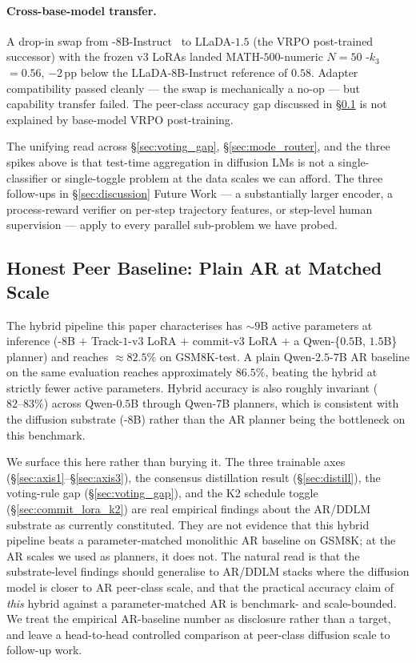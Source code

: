 \paragraph{Cross-base-model transfer.}
A drop-in swap from \LLaDA{}-$8$B-Instruct~\citep{nie2025llada} to
LLaDA-$1.5$ (the VRPO post-trained successor) with the frozen v$3$
LoRAs landed MATH-$500$-numeric $N{=}50$ \cmajc{}-$k_3$ $= 0.56$,
$-2$\,pp below the LLaDA-$8$B-Instruct reference of $0.58$.
Adapter compatibility passed cleanly --- the swap is mechanically
a no-op --- but capability transfer failed.  The peer-class
accuracy gap discussed in \S\ref{subsec:ar_baseline} is not
explained by base-model VRPO post-training.

\medskip

The unifying read across \S\ref{sec:voting_gap},
\S\ref{sec:mode_router}, and the three spikes above is that
test-time aggregation in diffusion LMs is not a
single-classifier or single-toggle problem at the data scales we
can afford.  The three follow-ups in \S\ref{sec:discussion} Future
Work --- a substantially larger encoder, a process-reward verifier
on per-step trajectory features, or step-level human supervision
---  apply to every parallel sub-problem we have probed.

\subsection{Honest Peer Baseline: Plain AR at Matched Scale}
\label{subsec:ar_baseline}

The hybrid pipeline this paper characterises has $\sim 9$B active
parameters at inference (\LLaDA{}-$8$B $+$ Track-$1$-v3 LoRA $+$
commit-v3 LoRA $+$ a Qwen-\{$0.5$B, $1.5$B\} planner) and reaches
\cmajc{} $\approx 82.5\%$ on GSM8K-test.  A plain Qwen-$2.5$-$7$B
AR baseline on the same evaluation reaches approximately $86.5\%$,
beating the hybrid at strictly fewer active parameters.  Hybrid
accuracy is also roughly invariant ($82\text{--}83\%$) across
Qwen-$0.5$B through Qwen-$7$B planners, which is consistent with
the diffusion substrate (\LLaDA{}-$8$B) rather than the AR planner
being the bottleneck on this benchmark.

We surface this here rather than burying it.  The three trainable
axes (\S\ref{sec:axis1}--\S\ref{sec:axis3}), the consensus
distillation result (\S\ref{sec:distill}), the voting-rule gap
(\S\ref{sec:voting_gap}), and the K2 schedule toggle
(\S\ref{sec:commit_lora_k2}) are real empirical findings about the
AR/DDLM substrate as currently constituted.  They are not evidence
that this hybrid pipeline beats a parameter-matched monolithic AR
baseline on GSM8K; at the AR scales we used as planners, it does
not.  The natural read is that the substrate-level findings should
generalise to AR/DDLM stacks where the diffusion model is closer
to AR peer-class scale, and that the practical accuracy claim of
\emph{this} hybrid against a parameter-matched AR is benchmark- and
scale-bounded.  We treat the empirical AR-baseline number as
disclosure rather than a target, and leave a head-to-head
controlled comparison at peer-class diffusion scale to follow-up
work.

